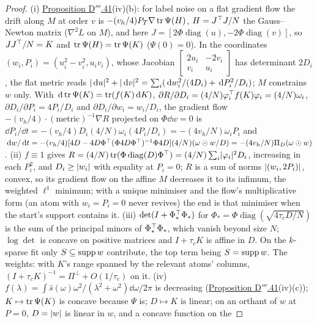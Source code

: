 \begin{proof}
(i) \hyperref[res:thmDppp:41]{Proposition D$'''$.41}(iv)(b): for label noise on a flat gradient flow the drift along
$M$ at order $v$ is $-(v_h/4)P_T\nabla\operatorname{tr}\Psi(H)$, $H = J^\top J/N$ the Gauss--Newton matrix ($\nabla^2L$ on $M$), and
here $J = [2\Phi\operatorname{diag}(u),-2\Phi\operatorname{diag}(v)]$, so $JJ^\top/N = K$ and
$\operatorname{tr}\Psi(H) = \operatorname{tr}\Psi(K)$ ($\Psi(0) = 0$). In the coordinates $(w_i,P_i) = (u_i^2 - v_i^2,u_iv_i)$, whose Jacobian
$\left[\begin{smallmatrix}2u_i & -2v_i\\ v_i & u_i\end{smallmatrix}\right]$ has determinant $2D_i$, the flat metric
reads $\lvert \,\mathrm{d} u\rvert^2 + \lvert \,\mathrm{d} v\rvert^2 = \sum_i(\,\mathrm{d} w_i^2/(4D_i) + \,\mathrm{d} P_i^2/D_i)$; $M$ constrains $w$ only. With
$\,\mathrm{d}\operatorname{tr}\Psi(K) = \operatorname{tr}(f(K)\,\mathrm{d} K)$, $\partial R/\partial D_i = (4/N)\varphi_i^\top f(K)\varphi_i = (4/N)\omega_i$,
$\partial D_i/\partial P_i = 4P_i/D_i$ and $\partial D_i/\partial w_i = w_i/D_i$, the gradient flow
$-(v_h/4)\cdot(\text{metric})^{-1}\nabla R$ projected on $\Phi\dd w = 0$ is
$\dd P_i/\dd t = -(v_h/4)D_i(4/N)\omega_i(4P_i/D_i) = -(4v_h/N)\omega_iP_i$ and
$\,\mathrm{d} w/\,\mathrm{d} t = -(v_h/4)[4D - 4D\Phi^\top(\Phi4D\Phi^\top)^{-1}\Phi4D](4/N)(\omega\odot w/D)
= -(4v_h/N)\Pi_D(\omega\odot w)$. (ii) $f\equiv1$ gives
$R = (4/N)\operatorname{tr}(\Phi\operatorname{diag}(D)\Phi^\top) = (4/N)\sum_i\lvert \varphi_i\rvert^2D_i$, increasing in each $P_i^2$, and
$D_i\ge\lvert w_i\rvert$ with equality at $P_i = 0$; $R$ is a sum of norms $\lvert (w_i,2P_i)\rvert$, convex, so its gradient flow on
the affine $M$ decreases it to its infimum, the weighted $\ell^1$ minimum; with a unique minimiser and the flow's
multiplicative form (an atom with $w_i = P_i = 0$ never revives) the end is that minimiser when the start's support
contains it. (iii) $\det(I + \Phi_*^\top\Phi_*)$ for $\Phi_* = \Phi\operatorname{diag}(\sqrt{4\tau_cD/N})$ is the sum of
the principal minors of $\Phi_*^\top\Phi_*$, which vanish beyond size $N$; $\log\det$ is concave on positive matrices and
$I + \tau_cK$ is affine in $D$. On the $k$-sparse fit only $S\subseteq\operatorname{supp} w$ contribute, the top term being
$S = \operatorname{supp} w$. The weights: with $K$'s range spanned by the relevant atoms' columns,
$(I + \tau_cK)^{-1} = \Pi^\perp + O(1/\tau_c)$ on it. (iv)
$f(\lambda) = \int\hat s(\omega)\omega^2/(\lambda^2 + \omega^2)\dd\omega/2\pi$ is decreasing
(\hyperref[res:thmDppp:41]{Proposition D$'''$.41}(iv)(c)); $K\mapsto\operatorname{tr}\Psi(K)$ is concave because $\Psi$ is;
$D\mapsto K$ is linear; on an orthant of $w$ at $P = 0$, $D = \lvert w\rvert$ is linear in $w$, and a concave function on the

\end{proof}
